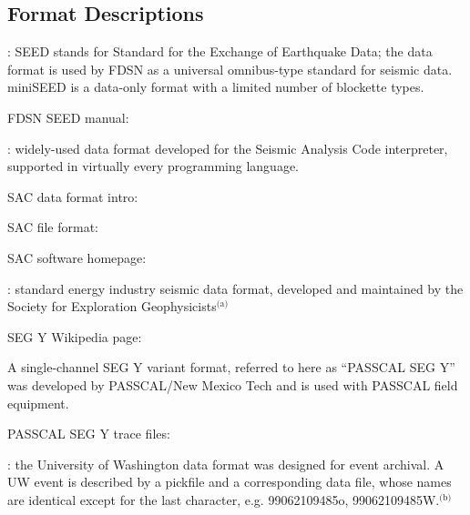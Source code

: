 \documentclass[letterpaper,11pt,english]{sphinxmanual}
\begin{document}
\subsection{Format Descriptions}
\label{\detokenize{src/Formats/fileformats:format-descriptions}}
: SEED stands for Standard for the Exchange of Earthquake Data; the data format is used by FDSN as a universal omnibus-type standard for seismic data. miniSEED is a data-only format with a limited number of blockette types. %
\begin{footnote}[1]\sphinxAtStartFootnote
FDSN SEED manual: 
%
\end{footnote}

: widely-used data format developed for the Seismic Analysis Code interpreter, supported in virtually every programming language. %
\begin{footnote}[2]\sphinxAtStartFootnote
SAC data format intro: 
%
\end{footnote} %
\begin{footnote}[3]\sphinxAtStartFootnote
SAC file format: 
%
\end{footnote} %
\begin{footnote}[4]\sphinxAtStartFootnote
SAC software homepage: 
%
\end{footnote}

: standard energy industry seismic data format, developed and maintained by the Society for Exploration Geophysicists$^{\text{(a)}}$ %
\begin{footnote}[5]\sphinxAtStartFootnote
SEG Y Wikipedia page: 
%
\end{footnote} A single-channel SEG Y variant format, referred to here as “PASSCAL SEG Y” was developed by PASSCAL/New Mexico Tech and is used with PASSCAL field equipment. %
\begin{footnote}[6]\sphinxAtStartFootnote
PASSCAL SEG Y trace files: 
%
\end{footnote}

: the University of Washington data format was designed for event archival. A UW event is described by a pickfile and a corresponding data file, whose names are identical except for the last character, e.g. 99062109485o, 99062109485W.$^{\text{(b)}}$
\end{document}
